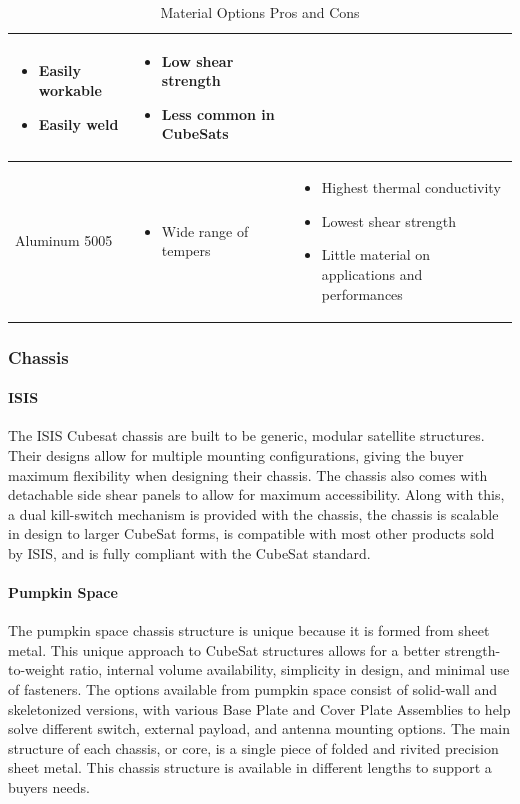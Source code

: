 \begin{table}[H]
\begin{tabular}{|p{}|p{}|p{}|}
\begin{itemize}
        \item Easily workable
        \item Easily weld
    \end{itemize}
    &
    \begin{itemize}
        \item Low shear strength
        \item Less common in CubeSats
    \end{itemize}
    \\
\hline
    Aluminum 5005
    &
    \begin{itemize}
        \item Wide range of tempers
    \end{itemize}
    &
    \begin{itemize}
        \item Highest thermal conductivity
        \item Lowest shear strength
        \item Little material on applications and performances
    \end{itemize}
    \\
\hline
\end{tabular}
\caption{Material Options Pros and Cons}
\label{tbl:Material_ProCon}
\end{table}
\subsubsection{Chassis}

\paragraph{ISIS}
The ISIS Cubesat chassis are built to be generic, modular satellite structures. Their designs allow for multiple mounting configurations, giving the buyer maximum flexibility when designing their chassis. The chassis also comes with detachable side shear panels to allow for maximum accessibility. Along with this, a dual kill-switch mechanism is provided with the chassis, the chassis is scalable in design to larger CubeSat forms, is compatible with most other products sold by ISIS, and is fully compliant with the CubeSat standard. \cite{isis2} 
\paragraph{Pumpkin Space}
The pumpkin space chassis structure is unique because it is formed from sheet metal. This unique approach to CubeSat structures allows for a better strength-to-weight ratio, internal volume availability, simplicity in design, and minimal use of fasteners. The options available from pumpkin space consist of solid-wall and skeletonized versions, with various Base Plate and Cover Plate Assemblies to help solve different switch, external payload, and antenna mounting options. The main structure of each chassis, or core, is a single piece of folded and rivited precision sheet metal. This chassis structure is available in different lengths to support a buyers needs.\cite{pumpkin_space} 
